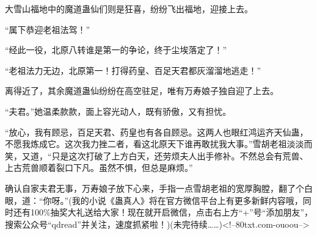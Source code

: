 \begin{this_body}
大雪山福地中的魔道蛊仙们则是狂喜，纷纷飞出福地，迎接上去。

“属下恭迎老祖法驾！”

“经此一役，北原八转谁是第一的争论，终于尘埃落定了！”

“老祖法力无边，北原第一！打得药皇、百足天君都灰溜溜地逃走！”

离得近了，其余魔道蛊仙纷纷在高空驻足，唯有万寿娘子独自迎了上去。

“夫君。”她温柔款款，面上容光动人，既有骄傲，又有担忧。

“放心，我有顾忌，百足天君、药皇也有各自顾忌。这两人也眼红鸿运齐天仙蛊，不愿我炼成它。这次我力挫二者，看这北原天下谁再敢扰我大事。”雪胡老祖淡淡而笑，又道，“只是这次打破了上方白天，还劳烦夫人出手修补。不然总会有荒兽、上古荒兽顺着裂口下凡。虽然不惧，但总是麻烦。”

确认自家夫君无事，万寿娘子放下心来，手指一点雪胡老祖的宽厚胸膛，翻了个白眼，道：“你呀。”(我的小说《蛊真人》将在官方微信平台上有更多新鲜内容哦，同时还有100\%抽奖大礼送给大家！现在就开启微信，点击右上方“+”号“添加朋友”，搜索公众号“qdread”并关注，速度抓紧啦！)(未完待续……)<!--80txt.com-ouoou-->

\end{this_body}

